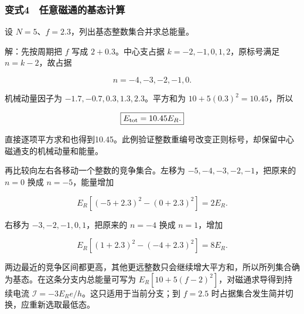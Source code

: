 \documentclass[12pt,a4paper,fontset=fandol]{ctexart}
\begin{document}
\noindent\begin{minipage}{\linewidth}
\subsubsection{变式4　任意磁通的基态计算}\label{ux53d8ux5f0f4-ux4efbux610fux78c1ux901aux7684ux57faux6001ux8ba1ux7b97}

设 \(N=5\)、\(f=2.3\)，列出基态整数集合并求总能量。

解：先按周期把 \(f\) 写成 \(2+0.3\)。中心支占据
\(k=-2,-1,0,1,2\)，原标号满足 \(n=k-2\)，故占据

\[\boxed{n=-4,-3,-2,-1,0.}\]

机械动量因子为 \(-1.7,-0.7,0.3,1.3,2.3\)。平方和为
\(10+5(0.3)^2=10.45\)，所以

\[\boxed{E_{\rm tot}=10.45E_R.}\]

直接逐项平方求和也得到10.45。此例验证整数重编号改变正则标号，却保留中心磁通支的机械动量和能量。

再比较向左右各移动一个整数的竞争集合。左移为
\(-5,-4,-3,-2,-1\)，把原来的 \(n=0\) 换成 \(n=-5\)，能量增加

\[E_R[(-5+2.3)^2-(0+2.3)^2]=2E_R.\]

右移为 \(-3,-2,-1,0,1\)，把原来的 \(n=-4\) 换成 \(n=1\)，增加

\[E_R[(1+2.3)^2-(-4+2.3)^2]=8E_R.\]

两边最近的竞争区间都更高，其他更远整数只会继续增大平方和，所以所列集合确为基态。在这条分支内总能量可写为
\(E_R[10+5(f-2)^2]\)，对磁通求导得到持续电流
\(\mathcal I=-3E_Re/h\)。这只适用于当前分支；到 \(f=2.5\)
时占据集合发生简并切换，应重新选取最低态。

\end{minipage}
\end{document}
